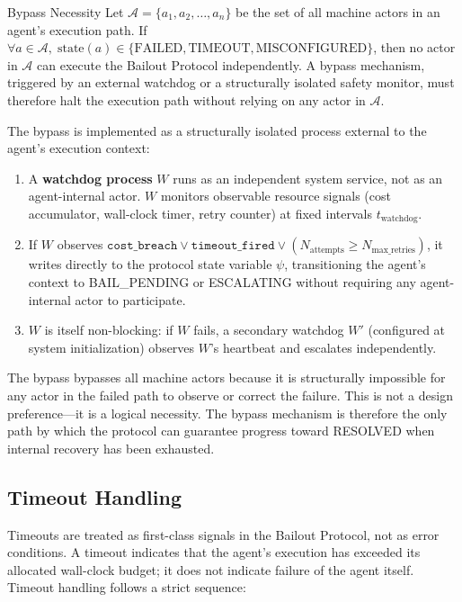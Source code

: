 \begin{invariant}{Bypass Necessity}
Let $\mathcal{A} = \{a_1, a_2, \ldots, a_n\}$ be the set of all machine actors in an agent's execution path. If $\forall a \in \mathcal{A}, \; \text{state}(a) \in \{\text{FAILED}, \text{TIMEOUT}, \text{MISCONFIGURED}\}$, then no actor in $\mathcal{A}$ can execute the Bailout Protocol independently. A bypass mechanism, triggered by an external watchdog or a structurally isolated safety monitor, must therefore halt the execution path without relying on any actor in $\mathcal{A}$.
\end{invariant}

The bypass is implemented as a structurally isolated process external to the agent's execution context:

\begin{enumerate}
\item A \textbf{watchdog process} $W$ runs as an independent system service, not as an agent-internal actor. $W$ monitors observable resource signals (cost accumulator, wall-clock timer, retry counter) at fixed intervals $t_\text{watchdog}$.
\item If $W$ observes $\texttt{cost\_breach} \lor \texttt{timeout\_fired} \lor (N_\text{attempts} \geq N_\text{max\_retries})$, it writes directly to the protocol state variable $\psi$, transitioning the agent's context to BAIL\_PENDING or ESCALATING without requiring any agent-internal actor to participate.
\item $W$ is itself non-blocking: if $W$ fails, a secondary watchdog $W'$ (configured at system initialization) observes $W$'s heartbeat and escalates independently.
\end{enumerate}

The bypass bypasses all machine actors because it is structurally impossible for any actor in the failed path to observe or correct the failure. This is not a design preference—it is a logical necessity. The bypass mechanism is therefore the only path by which the protocol can guarantee progress toward RESOLVED when internal recovery has been exhausted.

\bigskip

\subsection{Timeout Handling}

Timeouts are treated as first-class signals in the Bailout Protocol, not as error conditions. A timeout indicates that the agent's execution has exceeded its allocated wall-clock budget; it does not indicate failure of the agent itself. Timeout handling follows a strict sequence:

